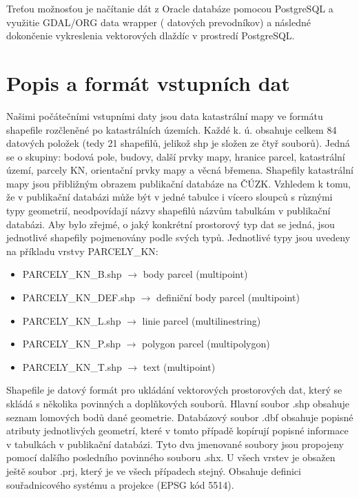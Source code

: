 \documentclass[12pt]{article}
\begin{document}
 Treťou možnosťou je načítanie dát z Oracle databáze pomocou PostgreSQL a využitie GDAL/ORG data wrapper ( datových prevodníkov) a následné dokončenie vykreslenia vektorových dlaždíc v prostredí PostgreSQL.

\clearpage
\section{Popis a formát vstupních dat}
Našimi počátečními vstupními daty jsou data katastrální mapy ve formátu shapefile rozčleněné po katastrálních územích. Každé k. ú. obsahuje celkem 84 datových položek (tedy 21 shapefilů, jelikož shp je složen ze čtyř souborů). Jedná se o skupiny: bodová pole, budovy, další prvky mapy, hranice parcel, katastrální území, parcely KN, orientační prvky mapy a věcná břemena. Shapefily katastrální mapy jsou přibližným obrazem publikační databáze na ČÚZK. Vzhledem k tomu, že v publikační databázi může být v jedné tabulce i vícero sloupců s různými typy geometrií, neodpovídají názvy shapefilů názvům tabulkám v publikační databázi. Aby bylo zřejmé, o jaký konkrétní prostorový typ dat se jedná, jsou jednotlivé shapefily pojmenovány podle svých typů. Jednotlivé typy jsou uvedeny na příkladu vrstvy PARCELY\_KN: 

\begin{itemize}
\item PARCELY\_KN\_B.shp $\rightarrow$ body parcel (multipoint)
\item PARCELY\_KN\_DEF.shp $\rightarrow$ definiční body parcel (multipoint)
\item PARCELY\_KN\_L.shp $\rightarrow$ linie parcel (multilinestring)
\item PARCELY\_KN\_P.shp $\rightarrow$ polygon parcel (multipolygon)
\item PARCELY\_KN\_T.shp $\rightarrow$ text (multipoint)
\end{itemize}

Shapefile je datový formát pro ukládání vektorových prostorových dat, který se skládá s několika povinných a doplňkových souborů. Hlavní soubor .shp obsahuje seznam lomových bodů dané geometrie. Databázový soubor .dbf obsahuje popisné atributy jednotlivých geometrí, které v tomto případě kopírují popisné informace v tabulkách v publikační databázi. Tyto dva jmenované soubory jsou propojeny pomocí dalšího posledního povinného souboru .shx. U všech vrstev je obsažen ještě soubor .prj, který je ve všech případech stejný. Obsahuje definici souřadnicového systému a projekce (EPSG kód 5514). \\
\end{document}
